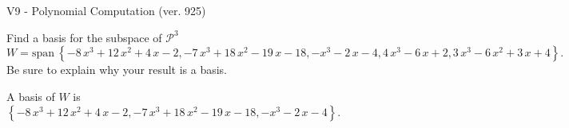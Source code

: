 \begin{exercise}
  \begin{exerciseTitle}V9 - Polynomial Computation (ver. 925)\end{exerciseTitle}
  \begin{exerciseStatement}
    Find a basis for the subspace of \(\mathcal{P}^3\) 
\[W=\mathrm{span}\ \left\{-8 \, x^{3} + 12 \, x^{2} + 4 \, x - 2 , -7 \, x^{3} + 18 \, x^{2} - 19 \, x - 18 , -x^{3} - 2 \, x - 4 , 4 \, x^{3} - 6 \, x + 2 , 3 \, x^{3} - 6 \, x^{2} + 3 \, x + 4\right\}.\]
 Be sure to explain why your result is a basis.


  \end{exerciseStatement}
  \begin{exerciseAnswer}
   A basis of \(W\) is  \(\left\{-8 \, x^{3} + 12 \, x^{2} + 4 \, x - 2 , -7 \, x^{3} + 18 \, x^{2} - 19 \, x - 18 , -x^{3} - 2 \, x - 4\right\}\).
  


  \end{exerciseAnswer}
\end{exercise}